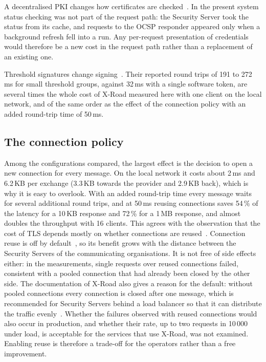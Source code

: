 \documentclass[conference,a4paper]{IEEEtran}
\newcommand{\newtext}[1]{{\color{blue}#1}}
\begin{document}
A decentralised PKI changes how certificates are checked~\cite{bakhtina2023ares}. In the present
system status checking was not part of the request path: the Security Server took the status from
its cache, and requests to the OCSP responder appeared only when a background refresh fell into a
run. Any per-request
presentation of credentials would therefore be a new cost in the request path rather than a
replacement of an existing one.

Threshold signatures change signing~\cite{bakhtina2026ijis}. Their reported round trips of 191 to
272\,ms for small threshold groups, against 32\,ms with a single software token, are several times the
whole cost of X-Road measured here with one client on the local network, and of the same order as the
effect of the connection policy with an added round-trip time of 50\,ms.

\subsection{The connection policy}

Among the configurations compared, the largest effect is the decision to open a new connection for
every message. On the local network it costs about 2\,ms and 6.2\,KB per exchange (3.3\,KB towards the provider
and 2.9\,KB back),
which is why it is easy to overlook. With an added round-trip time every message waits for several
additional round trips, and at 50\,ms reusing connections saves 54\,\% of the latency for a 10\,KB
response and 72\,\% for a 1\,MB response, and almost doubles the throughput with 16 clients. This
agrees with the observation that the cost of TLS depends mostly on whether connections are
reused~\cite{naylor2014}. Connection reuse is off by default~\cite{xroadsyspar}, so its benefit grows
with the distance between the Security Servers of the communicating organisations. It is not free of
side effects either: in the measurements, single requests over reused connections failed, consistent
with a pooled connection that had already been closed by the other side. \newtext{The documentation
of X-Road also gives a reason for the default: without pooled connections every connection is closed
after one message, which is recommended for Security Servers behind a load balancer so that it can
distribute the traffic evenly~\cite{xroadsyspar,xroadxlb}. Whether the failures observed with reused
connections would also occur in production, and whether their rate, \newtext{up to} two requests in 10\,000
under load, is acceptable for the services that use X-Road, was not examined. Enabling reuse is
therefore a trade-off for the operators rather than a free improvement.}
\end{document}

